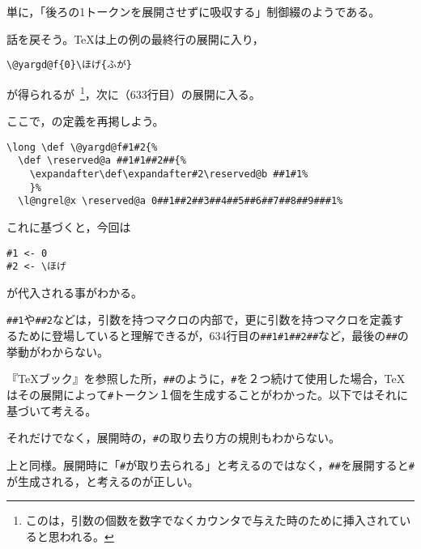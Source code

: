 \documentclass[autodetect-engine,dvipdfmx]{jsarticle}
\begin{document}
単に，「後ろの1トークンを展開させずに吸収する」制御綴のようである。

話を戻そう。\TeX は上の例の最終行の展開に入り，
\texsource
\begin{lstlisting}
\@yargd@f{0}\ほげ{ふが}
\end{lstlisting}

が得られるが\ \footnote{このは，引数の個数を数字でなくカウンタで与えた時のために挿入されていると思われる。}，次に（633行目）の展開に入る。

ここで，の定義を再掲しよう。
\latexltx
\begin{lstlisting}[firstnumber=633]
\long \def \@yargd@f#1#2{%
  \def \reserved@a ##1#1##2##{%
    \expandafter\def\expandafter#2\reserved@b ##1#1%
    }%
  \l@ngrel@x \reserved@a 0##1##2##3##4##5##6##7##8##9###1%
\end{lstlisting}

これに基づくと，今回は
\texsource
\begin{lstlisting}
#1 <- 0
#2 <- \ほげ
\end{lstlisting}

が代入される事がわかる。

\begin{question}
\verb|##1|や\preSub\verb|##2|などは，引数を持つマクロの内部で，更に引数を持つマクロを定義するために登場していると理解できるが，634行目の\preSub\verb|##1#1##2##|\preSub など，最後の\preSub\verb|##|\preSub の挙動がわからない。
\end{question}

\begin{answer}
『\TeX ブック』を参照した所，\verb|##|\preSub のように，\verb|#|\preSub を２つ続けて使用した場合，\TeX はその展開によって\preSub\verb|#|\preSub トークン１個を生成することがわかった。以下ではそれに基づいて考える。

\end{answer}

\begin{question}
それだけでなく，展開時の，\preSub\verb|#|\preSub の取り去り方の規則もわからない。
\end{question}

\begin{answer}
上と同様。展開時に「\preSub\verb|#|\preSub が取り去られる」と考えるのではなく，\preSub\verb|##|\preSub を展開すると\preSub\verb|#|\preSub が生成される，と考えるのが正しい。

\end{answer}
\end{document}

